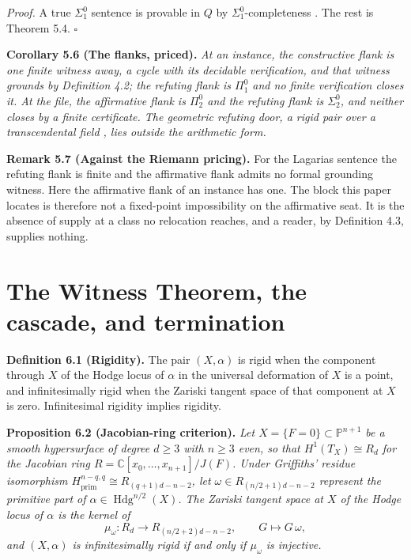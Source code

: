 \documentclass[10pt,twocolumn]{article}
\begin{document}
\emph{Proof.} A true \(\Sigma^0_1\) sentence is provable in \(Q\) by
\(\Sigma^0_1\)-completeness \cite{kaye1991,hp1993}. The rest is Theorem
5.4. \(\square\)

\textbf{Corollary 5.6 (The flanks, priced).} \emph{At an instance, the
constructive flank is one finite witness away, a cycle with its
decidable verification, and that witness grounds by Definition 4.2; the
refuting flank is \(\Pi^0_1\) and no finite verification closes it. At
the file, the affirmative flank is \(\Pi^0_2\) and the refuting flank is
\(\Sigma^0_2\), and neither closes by a finite certificate. The
geometric refuting door, a rigid pair over a transcendental field
\cite{voisin2016}, lies outside the arithmetic form.}

\textbf{Remark 5.7 (Against the Riemann pricing).} For the Lagarias
sentence the refuting flank is finite and the affirmative flank admits
no formal grounding witness. Here the affirmative flank of an instance
has one. The block this paper locates is therefore not a fixed-point
impossibility on the affirmative seat. It is the absence of supply at a
class no relocation reaches, and a reader, by Definition 4.3, supplies
nothing.

\hypertarget{the-witness-theorem-the-cascade-and-termination}{%
\section{The Witness Theorem, the cascade, and
termination}\label{the-witness-theorem-the-cascade-and-termination}}

\textbf{Definition 6.1 (Rigidity).} The pair \((X,\alpha)\) is rigid
when the component through \(X\) of the Hodge locus of \(\alpha\) in the
universal deformation of \(X\) is a point, and infinitesimally rigid
when the Zariski tangent space of that component at \(X\) is zero.
Infinitesimal rigidity implies rigidity.

\textbf{Proposition 6.2 (Jacobian-ring criterion).} \emph{Let
\(X=\{F=0\}\subset\mathbb{P}^{n+1}\) be a smooth hypersurface of degree
\(d\ge 3\) with \(n\ge 3\) even, so that \(H^1(T_X)\cong R_d\) for the
Jacobian ring \(R=\mathbb{C}[x_0,\dots,x_{n+1}]/J(F)\). Under Griffiths'
residue isomorphism \(H^{n-q,q}_{\mathrm{prim}}\cong R_{(q+1)d-n-2}\),
let \(\omega\in R_{(n/2+1)d-n-2}\) represent the primitive part of
\(\alpha\in\operatorname{Hdg}^{n/2}(X)\). The Zariski tangent space at
\(X\) of the Hodge locus of \(\alpha\) is the kernel of}
\[\mu_\omega\colon R_d\longrightarrow R_{(n/2+2)d-n-2},\qquad G\longmapsto G\,\omega,\]
\emph{and \((X,\alpha)\) is infinitesimally rigid if and only if
\(\mu_\omega\) is injective.}
\end{document}

